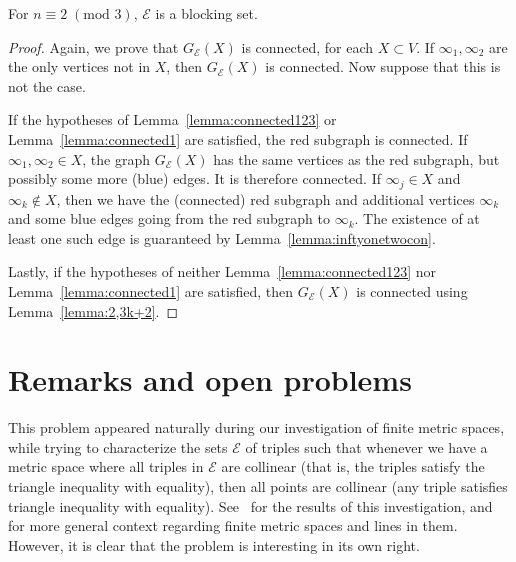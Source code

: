 \documentclass[11pt,a4paper]{article}
\begin{document}
\begin{theorem}\label{theorem:main3k+2}
    For $n \equiv 2 \; ({\mbox{mod }} 3)$, $\mathcal{E}$ is a blocking set.
\end{theorem}


\begin{proof}%
    Again, we prove that $G_{\mathcal{E}}(X)$ is connected, for each $X \subset V$. If $\infty_1, \infty_2$ are the only vertices not in $X$, then $G_{\mathcal{E}}(X)$ is connected. Now suppose that this is not the case.

    If the hypotheses of Lemma~\ref{lemma:connected123} or Lemma~\ref{lemma:connected1} are satisfied, the red subgraph is connected. If $\infty_1, \infty_2 \in X$, the graph $G_{\mathcal{E}}(X)$ has the same vertices as the red subgraph, but possibly some more (blue) edges. It is therefore connected. If $\infty_j \in X$ and $\infty_k \notin X$, then we have the (connected) red subgraph and additional vertices $\infty_k$ and some blue edges going from the red subgraph to $\infty_k$. The existence of at least one such edge is guaranteed by  Lemma~\ref{lemma:inftyonetwocon}.

    Lastly, if the hypotheses of neither Lemma~\ref{lemma:connected123} nor Lemma~\ref{lemma:connected1} are satisfied, then $G_{\mathcal{E}}(X)$ is connected using Lemma~\ref{lemma:2,3k+2}.
\end{proof}

















\section{Remarks and open problems}

This problem appeared naturally during our investigation of finite metric spaces, while trying to characterize the sets $\mathcal{E}$ of triples such that whenever we have a metric space where all triples in $\mathcal{E}$ are collinear (that is, the triples satisfy the triangle inequality with equality), then all points are collinear (any triple satisfies triangle inequality with equality).
See~\cite{anchors} for the results of this investigation, and~\cite{ChvSurvey} for more general context regarding finite metric spaces and lines in them.
However, it is clear that the problem is interesting in its own right.
\end{document}
